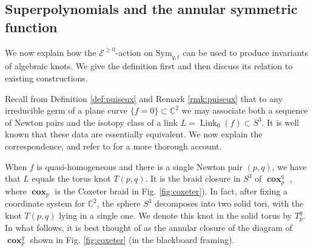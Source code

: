 \documentclass{amsart}
\numberwithin{equation}{section}
\theoremstyle{definition}
\def\Sym{{\mathrm{Sym}}}
\DeclareMathOperator{\Link}{Link}
\DeclareMathOperator{\cox}{\textbf{cox}}
\newcommand{\cE}{\mathcal{E}}
\newcommand{\C}{{\mathbb C}}
\begin{document}
\subsection{Superpolynomials and the annular symmetric function}
\label{sec:knots}
We now explain how the $\cE^{\geq 0}$-action on $\Sym_{q,t}$ can be used to produce invariants of algebraic knots.
We give the definition first and then discuss its relation to existing constructions.

Recall from Definition \ref{def:puiseux} and Remark \ref{rmk:puiseux} that to any irreducible germ of a plane curve $\{f=0\}\subset \C^2$  we may associate both a sequence of Newton pairs and the isotopy class of a link $L=\Link_0(f)\subset S^3$. 
It is well known that these data are essentially equivalent. We now explain the correspondence, and refer to \cite{EN} for a more thorough account.

When $f$ is quasi-homogeneous and there is a single Newton pair $(p,q)$, we have that $L$ equals the torus knot $T(p,q)$. It is the braid closure in $S^3$ of $\cox_p^q$ , where $\cox_p$ is the Coxeter braid in Fig. \ref{fig:coxeter}). In fact, after fixing a coordinate system for $\C^2$, the sphere $S^3$ decomposes into two solid tori, with the knot $T(p,q)$ lying in a single one. We denote this knot in the solid torus by $T^q_p$. In what follows, it is best thought of as the annular closure of the diagram of $\cox_p^q$ shown in Fig. \ref{fig:coxeter} (in the blackboard framing).
\end{document}
